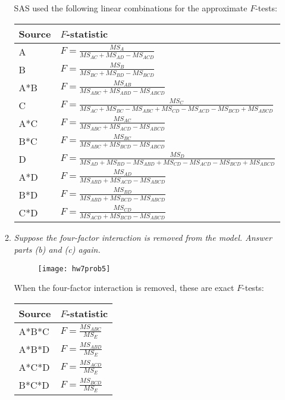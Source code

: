\documentclass[11pt]{article}
\begin{document}
\begin{enumerate}
\begin{enumerate}
SAS used the following linear combinations for the approximate \(F\)-tests:

\begin{table}[H]\centering\renewcommand{\arraystretch}{1.5}
\begin{tabular}{|l|l|}
\hline
Source & \(F\)-statistic \\
\hline
A & \(F=\frac{MS_{A}}{MS_{AC}+MS_{AD}-MS_{ACD}}\) \\
\hline
B & \(F=\frac{MS_{B}}{MS_{BC}+MS_{BD}-MS_{BCD}}\) \\
\hline
A*B & \(F=\frac{MS_{AB}}{MS_{ABC}+MS_{ABD}-MS_{ABCD}}\) \\
\hline
C & \(F=\frac{MS_{C}}
{MS_{AC}+MS_{BC}-MS_{ABC}+MS_{CD}-MS_{ACD}-MS_{BCD}+MS_{ABCD}}\) \\
\hline
A*C & \(F=\frac{MS_{AC}}{MS_{ABC}+MS_{ACD}-MS_{ABCD}}\) \\
\hline
B*C & \(F=\frac{MS_{BC}}{MS_{ABC}+MS_{BCD}-MS_{ABCD}}\) \\
\hline
D & \(F=\frac{MS_{D}}
{MS_{AD}+MS_{BD}-MS_{ABD}+MS_{CD}-MS_{ACD}-MS_{BCD}+MS_{ABCD}}\) \\
\hline
A*D & \(F=\frac{MS_{AD}}{MS_{ABD}+MS_{ACD}-MS_{ABCD}}\) \\
\hline
B*D & \(F=\frac{MS_{BD}}{MS_{ABD}+MS_{BCD}-MS_{ABCD}}\) \\
\hline
C*D & \(F=\frac{MS_{CD}}{MS_{ACD}+MS_{BCD}-MS_{ABCD}}\) \\
\hline
\end{tabular}
\end{table}

\item %
{\it Suppose the four-factor interaction is removed from the model. Answer
parts (b) and (c) again.}


\begin{figure}[H]\centering
\texttt{[image: hw7prob5]}
\end{figure}

\pagebreak
When the four-factor interaction is removed, these are exact \(F\)-tests:

\begin{table}[H]\centering\renewcommand{\arraystretch}{1.5}
\begin{tabular}{|l|l|}
\hline
Source & \(F\)-statistic \\
\hline
A*B*C & \(F=\frac{MS_{ABC}}{MS_{E}}\) \\
\hline
A*B*D & \(F=\frac{MS_{ABD}}{MS_{E}}\) \\
\hline
A*C*D & \(F=\frac{MS_{ACD}}{MS_{E}}\) \\
\hline
B*C*D & \(F=\frac{MS_{BCD}}{MS_{E}}\) \\
\hline
\end{tabular}
\end{table}


\end{enumerate}
\end{enumerate}
\end{document}
